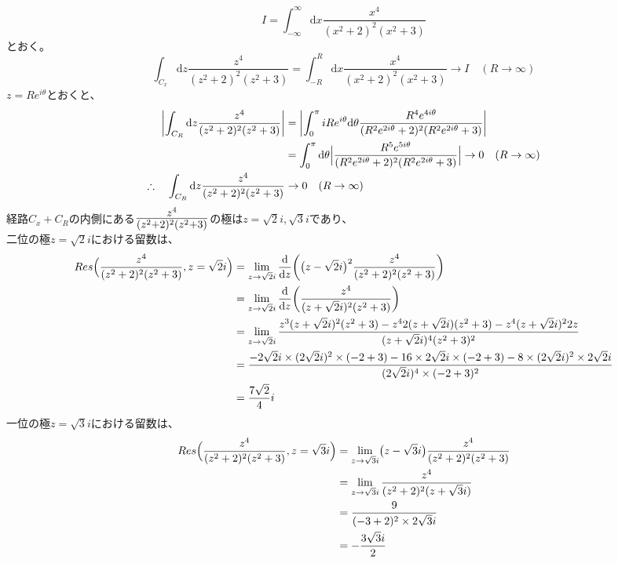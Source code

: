 \documentclass[dvipdfmx,a4paper]{jsarticle}
\begin{document}
\subsection{}
$$
I = \int^{\infty}_{-\infty}\mathrm{d}x\frac{x^4}{(x^2+2)^2(x^2+3)}
$$
とおく。
$$
\int_{C_x}\mathrm{d}z\frac{z^4}{(z^2+2)^2(z^2+3)} = \int^{R}_{-R}\mathrm{d}x\frac{x^4}{(x^2+2)^2(x^2+3)} \to I \quad(R \to \infty)
$$
$z = Re^{i\theta}$とおくと、
\begin{align*}
\biggl|\int_{C_R}\mathrm{d}z\frac{z^4}{(z^2+2)^2(z^2+3)}\biggr| 
&= \biggl|\int^{\pi}_{0}i Re^{i\theta}\mathrm{d}\theta\frac{R^4e^{4i\theta}}{(R^2e^{2i\theta} + 2)^2(R^2e^{2i\theta} + 3)}\biggr|\\
&= \int^{\pi}_{0}\mathrm{d}\theta\Bigl|\frac{R^5e^{5i\theta}}{(R^2e^{2i\theta} + 2)^2(R^2e^{2i\theta} + 3)}\Bigr| \to 0 \quad(R \to \infty)\\
\therefore \quad\int_{C_R}\mathrm{d}z\frac{z^4}{(z^2+2)^2(z^2+3)} &\to 0 \quad(R \to \infty)
\end{align*}
経路$C_x + C_R$の内側にある$\mbox{\Large$\frac{z^4}{(z^2+2)^2(z^2+3)}$}$の極は$z =  \sqrt{2}i,\sqrt{3}i$であり、\\
二位の極$z = \sqrt{2}i$における留数は、
\begin{align*}
Res\Bigl(\frac{z^4}{(z^2+2)^2(z^2+3)}, z = \sqrt{2}i\Bigr) &= \lim_{z \to\sqrt{2}i}\frac{\mathrm{d}}{\mathrm{d}z}\biggl(\bigl(z - \sqrt{2}i\bigr)^2\frac{z^4}{(z^2+2)^2(z^2+3)}\biggr)\\
&= \lim_{z \to\sqrt{2}i}\frac{\mathrm{d}}{\mathrm{d}z}\biggl(\frac{z^4}{(z + \sqrt{2}i)^2(z^2+3)}\biggr)\\
&=  \lim_{z \to\sqrt{2}i}\frac{z^3(z + \sqrt{2}i)^2(z^2+3)-z^42(z + \sqrt{2}i)(z^2+3)-z^4(z + \sqrt{2}i)^22z}{(z + \sqrt{2}i)^4(z^2+3)^2}\\
&= \frac{-2\sqrt{2}i\times(2\sqrt{2}i)^2 \times (-2 + 3) - 16\times2\sqrt{2}i \times (-2 + 3) - 8 \times(2\sqrt{2}i)^2 \times2\sqrt{2}i}{(2\sqrt{2}i)^4 \times (-2 + 3)^2}\\
&= \frac{7\sqrt{2}}{4}i
\end{align*}
一位の極$z = \sqrt{3}i$における留数は、
\begin{align*}
Res\Bigl(\frac{z^4}{(z^2+2)^2(z^2+3)}, z = \sqrt{3}i\Bigr) &= \lim_{z \to \sqrt{3}i}\bigl(z - \sqrt{3}i\bigr)\frac{z^4}{(z^2+2)^2(z^2+3)}\\
&= \lim_{z \to \sqrt{3}i}\frac{z^4}{(z^2+2)^2(z+\sqrt{3}i)}\\
&= \frac{9}{(-3 + 2)^2 \times 2\sqrt{3}i}\\
&= -\frac{3\sqrt{3}i}{2}
\end{align*}
\end{document}
